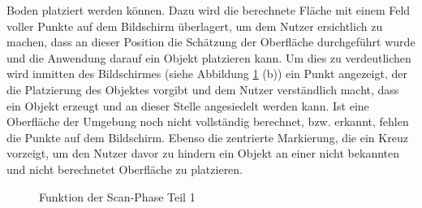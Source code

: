 Boden platziert werden können. Dazu wird die berechnete Fläche mit einem Feld voller Punkte auf dem Bildschirm überlagert, um dem Nutzer ersichtlich zu machen, 
dass an dieser Position die Schätzung der Oberfläche durchgeführt wurde und die Anwendung darauf ein Objekt platzieren kann. Um dies zu verdeutlichen wird inmitten 
des Bildschirmes (siehe Abbildung \ref{pic:markerTracking} (b)) ein Punkt angezeigt, der die Platzierung des Objektes vorgibt und dem Nutzer verständlich macht, 
dass ein Objekt erzeugt und an dieser Stelle angesiedelt werden kann. Ist eine Oberfläche der Umgebung noch nicht vollständig berechnet, bzw. erkannt, fehlen 
die Punkte auf dem Bildschirm. Ebenso die zentrierte Markierung, die ein Kreuz vorzeigt, um den Nutzer davor zu hindern ein Objekt an einer nicht bekannten und 
nicht berechnetet Oberfläche zu platzieren.
\begin{figure}[hbt!]
    \centering
    \caption{Funktion der Scan-Phase Teil 1}
    \label{pic:markerTracking}
\end{figure}
